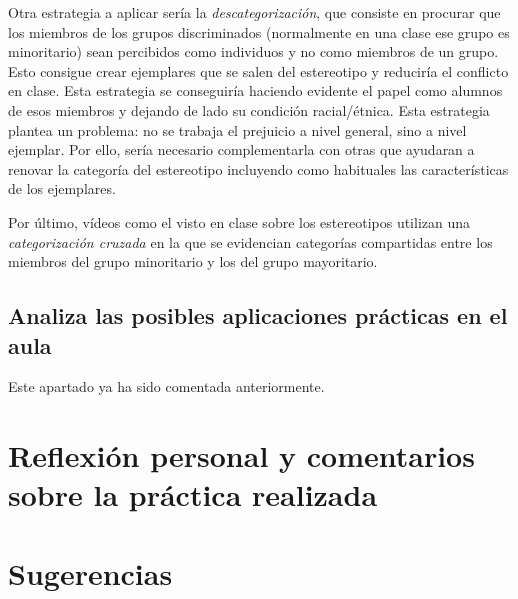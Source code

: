 \documentclass[palatino,nochap]{apuntesURJC}
\begin{document}
Otra estrategia a aplicar sería la \textit{descategorización}, que consiste en procurar que los miembros de los grupos discriminados (normalmente en una clase ese grupo es minoritario) sean percibidos como individuos y no como miembros de un grupo.
%
Esto consigue crear ejemplares que se salen del estereotipo y reduciría el conflicto en clase.
%
Esta estrategia se conseguiría haciendo evidente el papel como alumnos de esos miembros y dejando de lado su condición racial/étnica.
%
Esta estrategia plantea un problema: no se trabaja el prejuicio a nivel general, sino a nivel ejemplar. 
%
Por ello, sería necesario complementarla con otras que ayudaran a renovar la categoría del estereotipo incluyendo como habituales las características de los ejemplares.

Por último, vídeos como el visto en clase sobre los estereotipos utilizan una \textit{categorización cruzada} en la que se evidencian categorías compartidas entre los miembros del grupo minoritario y los del grupo mayoritario.

\subsection{Analiza las posibles aplicaciones prácticas en el aula}

Este apartado ya ha sido comentada anteriormente.

\section{Reflexión personal y comentarios sobre la práctica realizada}


\section{Sugerencias}




  
\label{bibliografia}

\printindex
\end{document}
